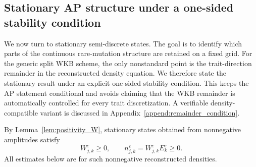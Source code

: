 \documentclass[11pt]{article}
\newtheorem{remark}{Remark}[section]
\begin{document}



\subsection{Stationary AP structure under a one-sided stability condition}
\label{subsec:stationary_discrete_AP}

We now turn to stationary semi-discrete states. The goal is to identify which
parts of the continuous rare-mutation structure are retained on a fixed grid.
For the generic split WKB scheme, the only nonstandard point is the
trait-direction remainder in the reconstructed density equation. We therefore
state the stationary result under an explicit one-sided stability condition.
This keeps the AP statement conditional and avoids claiming that the WKB
remainder is automatically controlled for every trait discretization. A
verifiable density-compatible variant is discussed in
Appendix~\ref{append:remainder_condition}.

By Lemma~\ref{lem:positivity_W}, stationary states obtained from nonnegative
amplitudes satisfy
\[
    W_{j,k}^\varepsilon\ge0,
    \qquad
    n_{j,k}^\varepsilon
    =W_{j,k}^\varepsilon E_k^\varepsilon\ge0 .
\]
All estimates below are for such nonnegative reconstructed densities.
\end{document}
